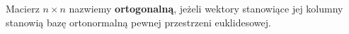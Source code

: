 \begin{definition}
Macierz \(n \times n\) nazwiemy \textbf{ortogonalną}, jeżeli wektory stanowiące jej kolumny stanowią bazę ortonormalną pewnej przestrzeni euklidesowej.
\end{definition}

